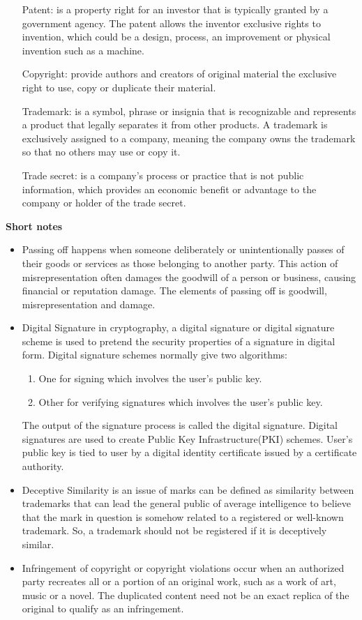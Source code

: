 \documentclass[14 pt, letterpaper]{extarticle}
\begin{document}
	\begin{enumerate}
		\item[Patent:] is a property right for an investor that is typically granted by a government agency. The patent allows the inventor exclusive rights to invention, which could be a design, process, an improvement or physical invention such as a machine.
		\item [Copyright:] provide authors and creators of original material the exclusive right to use, copy or duplicate their material.
		\item[Trademark:] is a symbol, phrase or insignia that is recognizable and represents a product that legally separates it from other products. A trademark is exclusively assigned to a company, meaning the company owns the trademark so that no others may use or copy it.
		\item [Trade secret:] is a company's process or practice that is not public information, which provides an economic benefit or advantage to the company or holder of the trade secret.
	\end{enumerate}
	
	\textbf{Short notes}\linebreak
	\begin{itemize}
		\item Passing off happens when someone deliberately or unintentionally passes of their goods or services as those belonging to another party. This action of misrepresentation often damages the goodwill of a person or business, causing financial or reputation damage. The elements of passing off is goodwill, misrepresentation and damage.
		\item Digital Signature in cryptography, a digital signature or digital signature scheme is used to pretend the security properties of a signature in digital form. Digital signature schemes normally give two algorithms:
		\begin{enumerate}
			\item One for signing which involves the user's public key.
			\item Other for verifying signatures which involves the user's public key.
		\end{enumerate}
		The output of the signature process is called the digital signature. Digital signatures are used to create Public Key Infrastructure(PKI) schemes. User's public key is tied to user by a digital identity certificate issued by a certificate authority.
		\item Deceptive Similarity is an issue of  marks can be defined as similarity between trademarks that can lead the general public of average intelligence to believe that the mark in question is somehow related to a registered or well-known trademark. So, a trademark should not be registered if it is deceptively similar.
		\item Infringement of copyright or copyright violations occur when an authorized party recreates all or a portion of an original work, such as a work of art, music or a novel. The duplicated content need not be an exact replica of the original to qualify as an infringement.
	\end{itemize}
	
\end{document}
